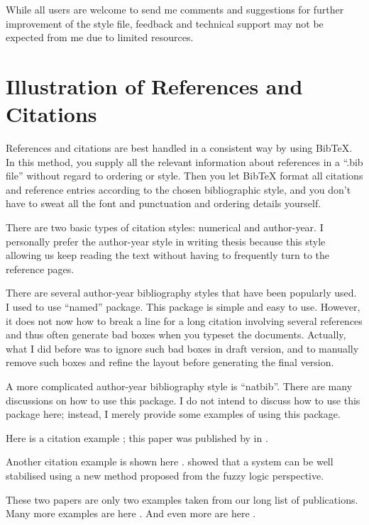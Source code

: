     While all users are welcome to send me comments and suggestions for further improvement of the style file, feedback and technical support may not be expected from me due to limited resources.
    
\section{Illustration of References and Citations} 

References and citations are best handled in a consistent way by using BibTeX. In this method, you supply all the relevant information about references in a ``.bib file'' without regard to ordering or style. Then you let BibTeX format all citations and reference entries according to the chosen bibliographic style, and you don't have to sweat all the font and punctuation and ordering details yourself. 

There are two basic types of citation styles: numerical and author-year. I personally prefer the author-year style in writing thesis because this style allowing us keep reading the text without having to frequently turn to the reference pages. 

There are several author-year bibliography styles that have been popularly used. I used to use ``named'' package. This package is simple and easy to use. However, it does not now how to break a line for a long citation involving several references and thus often generate bad boxes when you typeset the documents. Actually, what I did before was to ignore such bad boxes in draft version, and to manually remove such boxes and refine the layout before generating the final version.  

A more complicated author-year bibliography style is ``natbib''. There are many discussions on how to use this package. I do not intend to discuss how to use this package here; instead, I merely provide some examples of using this package. 

Here is a citation example \citep{TianPLA07}; this paper was published by \citeauthor{TianPLA07} in \citeyear{TianPLA07}. 

Another citation example is shown here \citep{PengIEEETFS10}.  \citet{TianPLA07} showed that a system can be well stabilised using a new method proposed from the fuzzy logic perspective. 

These two papers \citep{TianPLA07,PengIEEETFS10} are only two examples taken from our long list of publications. Many more examples are here \citep{PengAML08,PengINS07,PengEJC06,TianINS07}. And even more are here \citep{Tian99,Tian98PhysicaD,TianIJCM07,TianINS07,TianJPC03}. 

